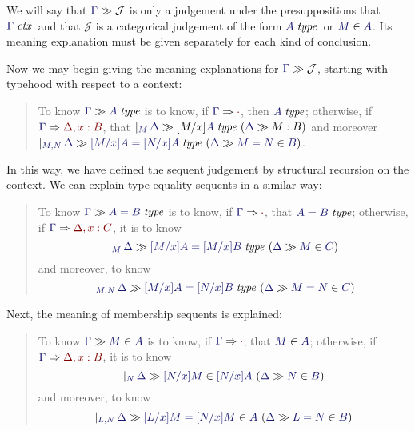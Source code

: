 \documentclass[main.tex]{subfiles}
\begin{document}
We will say that $\sequent{\Gamma}{\mathcal{J}}$ is only a judgement
under the presuppositions that $\isctx\Gamma$\ and that $\mathcal{J}$
is a categorical judgement of the form $\isset{A}$\ or
$\ver{M}{A}$. Its meaning explanation must be given separately for
each kind of conclusion.

Now we may begin giving the meaning explanations for
$\sequent{\Gamma}{\mathcal{J}}$, starting with typehood with respect to a context:

\begin{quote}

  To know $\sequent{\Gamma}{\isset{A}}$ is to know, if
$\reduce{\Gamma}{\cdot}$, then $\isset{A}$; otherwise, if
$\reduce{\Gamma}{\Delta,x:B}$, that
$\genj{M}{\hyp{\sequent{\Delta}{[M/x]\isset{A}}}{\sequent{\Delta}{M:B}}}$
and moreover
$\genj{M,N}{\hyp{\sequent{\Delta}{\isset{[M/x]A=[N/x]A}}}{\sequent{\Delta}{\ver{M=N}{B}}}}$.

\end{quote}

In this way, we have defined the sequent judgement by structural
recursion on the context. We can explain type equality sequents in a
similar way:

\begin{quote}
  To know $\sequent{\Gamma}{\isset{A=B}}$ is to know, if $\reduce{\Gamma}{\cdot}$, that $\isset{A=B}$; otherwise, if $\reduce{\Gamma}{\Delta,x:C}$, it is to know
  \[
    \genj{M}{
      \hyp{
        \sequent{\Delta}{
          \isset{
            [M/x]A=[M/x]B
          }
        }
      }{
        \sequent{\Delta}{
          \ver{M}{C}
        }
      }
    }
  \]
  and moreover, to know
  \[
    \genj{M,N}{
      \hyp{
        \sequent{\Delta}{
          \isset{[M/x]A=[N/x]B}
        }
      }{
        \sequent{\Delta}{
          \ver{M=N}{C}
        }
      }
    }
  \]
\end{quote}

Next, the meaning of membership sequents is explained:

\begin{quote}
  To know $\sequent{\Gamma}{\ver{M}{A}}$ is to know, if
  $\reduce\Gamma\cdot$, that $\ver{M}{A}$; otherwise, if
  $\reduce{\Gamma}{\Delta,x:B}$, it is to know
  \[
    \genj{N}{
      \hyp{
        \sequent{\Delta}{
          \ver{[N/x]M}{[N/x]A}
        }
      }{
        \sequent{\Delta}{
          \ver{N}{B}
        }
      }
    }
  \]
  and moreover, to know
  \[
    \genj{L,N}{
      \hyp{
        \sequent{\Delta}{
          \ver{[L/x]M=[N/x]M}{A}
        }
      }{
        \sequent{\Delta}{
          \ver{L=N}{B}
        }
      }
    }
  \]
\end{quote}
\end{document}
